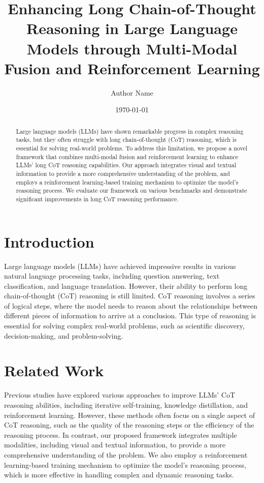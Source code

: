 \documentclass{article}
\begin{document}
\title{Enhancing Long Chain-of-Thought Reasoning in Large Language Models through Multi-Modal Fusion and Reinforcement Learning}

\author{Author Name}

\date{\today}

\maketitle

\begin{abstract}
Large language models (LLMs) have shown remarkable progress in complex reasoning tasks, but they often struggle with long chain-of-thought (CoT) reasoning, which is essential for solving real-world problems. To address this limitation, we propose a novel framework that combines multi-modal fusion and reinforcement learning to enhance LLMs' long CoT reasoning capabilities. Our approach integrates visual and textual information to provide a more comprehensive understanding of the problem, and employs a reinforcement learning-based training mechanism to optimize the model's reasoning process. We evaluate our framework on various benchmarks and demonstrate significant improvements in long CoT reasoning performance.
\end{abstract}

\section{Introduction}

Large language models (LLMs) have achieved impressive results in various natural language processing tasks, including question answering, text classification, and language translation. However, their ability to perform long chain-of-thought (CoT) reasoning is still limited. CoT reasoning involves a series of logical steps, where the model needs to reason about the relationships between different pieces of information to arrive at a conclusion. This type of reasoning is essential for solving complex real-world problems, such as scientific discovery, decision-making, and problem-solving.

\section{Related Work}

Previous studies have explored various approaches to improve LLMs' CoT reasoning abilities, including iterative self-training, knowledge distillation, and reinforcement learning. However, these methods often focus on a single aspect of CoT reasoning, such as the quality of the reasoning steps or the efficiency of the reasoning process. In contrast, our proposed framework integrates multiple modalities, including visual and textual information, to provide a more comprehensive understanding of the problem. We also employ a reinforcement learning-based training mechanism to optimize the model's reasoning process, which is more effective in handling complex and dynamic reasoning tasks.
\end{document}
